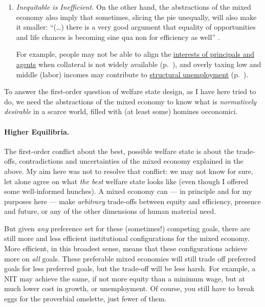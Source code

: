 \begin{enumerate}
\begin{enumerate}
		\item \emph{Inequitable is Inefficient.} On the other hand, the abstractions of the mixed economy also imply that sometimes, slicing the pie unequally, will also make it smaller:
``(\ldots) there is a very good argument that equality of opportunities and life chances is becoming sine qua non for efficiency as well'' \citep[ix]{Esping-Andersen2002}.

		For example, people may not be able to align the \hyperref[sec:principal-agent-problem]{interests of principals and agents} when collateral is not widely available (p.~\pageref{sec:principal-agent-problem}), and overly taxing low and middle (labor) incomes may contribute to \hyperref[sec:minimal-DWL]{structural unemployment} (p.~\pageref{sec:minimal-DWL}).
	\end{enumerate}

	To answer the first-order question of welfare state design, as I have here tried to do, we need the abstractions of the mixed economy to know what is \emph{normatively desirable} in a scarce world, filled with (at least some) homines oeconomici.
\end{enumerate}

\paragraph[Higher Equilibria]{Higher Equilibria.} The first-order conflict about the best, possible welfare state is about the trade-offs, contradictions and uncertainties of the mixed economy explained in the above.
My aim here was not to resolve that conflict:
we may not know for sure, let alone agree on what \emph{the best} welfare state looks like (even though I offered some well-informed hunches).
A mixed economy can --- in principle and for my purposes here --- make \emph{arbitrary} trade-offs between equity and efficiency, presence and future, or any of the other dimensions of human material need.


But given \emph{any} preference set for these (sometimes!) competing goals, there are still more and less efficient institutional configurations for the mixed economy.
More efficient, in this broadest sense, means that these configurations achieve more on \emph{all} goals.
These preferable mixed economies will still trade off preferred goals for less preferred goals, but the trade-off will be less harsh.
For example, a \gls{NIT} may achieve the same, if not more equity than a minimum wage, but at much lower cost in growth, or unemployment.
Of course, you still have to break eggs for the proverbial omelette, just fewer of them.

